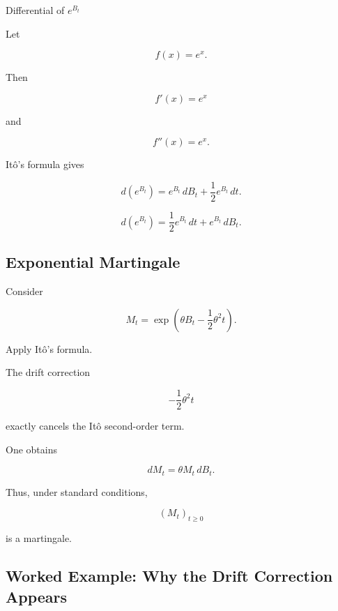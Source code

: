 \begin{workedexamplebox}{Differential of \(e^{B_t}\)}

Let

\[
f(x)=e^x.
\]

Then

\[
f'(x)=e^x
\]

and

\[
f''(x)=e^x.
\]

It\^o's formula gives

\[
d(e^{B_t})
=
e^{B_t}\,dB_t
+
\frac12e^{B_t}\,dt.
\]

\begin{answerbox}
\[
\boxed{
d(e^{B_t})
=
\frac12e^{B_t}\,dt
+
e^{B_t}\,dB_t.
}
\]
\end{answerbox}

\end{workedexamplebox}

\subsection{Exponential Martingale}
\label{subsec:exponential-martingale}

Consider

\[
\boxed{
M_t
=
\exp
\left(
\theta B_t
-
\frac12\theta^2t
\right).
}
\]

Apply It\^o's formula.

The drift correction

\[
-\frac12\theta^2t
\]

exactly cancels the It\^o second-order term.

One obtains

\[
\boxed{
dM_t
=
\theta M_t\,dB_t.
}
\]

Thus, under standard conditions,

\[
\boxed{
(M_t)_{t\geq0}
}
\]

is a martingale.

\subsection{Worked Example: Why the Drift Correction Appears}
\label{subsec:worked-exponential-martingale}

